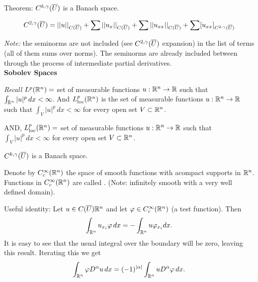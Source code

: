 \documentclass[12pt,a4paper]{report}
\newcommand{\CSPACE}{{C(\CONJ{U})}}
\newcommand{\CNORM}[1]{|| #1 ||_\CSPACE}
\newcommand{\HSPACE}[3]{C^{#1,#2}(#3)}
\begin{document}
Theorem: $\HSPACE{k}{\gamma}{\CONJ{U}}$ is a Banach space.

\begin{align*}
	\HSPACE{2}{\gamma}{\CONJ{U}} = \CNORM{u} + \sum \CNORM{u_x} + \sum \CNORM{u_{xx}} + \sum [ u_{xx} ]_{\HSPACE{2}{\gamma}{\CONJ{U}}}
\end{align*}

\textit{Note:}  the seminorms are not included (see $\HSPACE{2}{\gamma}{\CONJ{U}}$ expansion) in the list of terms (all of them sums over norms).  The seminorms are already included between through the process of intermediate partial derivatives.\\

\textbf{Sobolev Spaces}

\textit{Recall} $L^p(\mathbb{R}^n) = $ set of measurable functions $u: \mathbb{R}^n \to \mathbb{R}$ such that $\int_{\mathbb{R}^n} |u|^p\,dx < \infty$.  And $L^p_{\text{loc}}(\mathbb{R}^n)$ is the set of measurable functions $u: \mathbb{R}^n \to \mathbb{R}$ such that $\int_{V} |u|^p\,dx < \infty$ for every open set $V \subset \mathbb{R}^n$.

AND, $L^p_{\text{loc}}(\mathbb{R}^n) = $ set of measurable functions $u: \mathbb{R}^n \to \mathbb{R}$ such that $\int_V |u|^p\,dx < \infty$ for every open set $V \subset \mathbb{R}^n$.

\HLINE
\begin{theorem}
$\HSPACE{k}{\gamma}{\CONJ{U}}$ is a Banach space.\\
\end{theorem}

\begin{definition}Denote by $C_c^\infty(\mathbb{R}^n)$ the space of smooth functions with acompact supports in $\mathbb{R}^n$.  Functions in $C_c^\infty(\mathbb{R}^n)$ are called .  (Note: infinitely smooth with a very well defined domain).\\
\end{definition}

Useful identity:  Let $u \in \CSPACE{\R^n}$ and  let $\varphi \in C_c^\infty(\mathbb{R}^n)$ (a test function).  Then 
\begin{align*}
	\int_{\mathbb{R}^n} u_{x_i} \varphi\, dx = - \int_{\mathbb{R}^n} u\varphi_{x_i} dx.
\end{align*}It is easy to see that the usual integral over the boundary will be zero, leaving this result.  Iterating this we get
\begin{align*}
	\int_{\mathbb{R}^n} \varphi D^\alpha u\, dx = (-1)^{|\alpha|} \int_{\mathbb{R}^n} u D^\alpha \varphi \,dx.
\end{align*}
\end{document}
